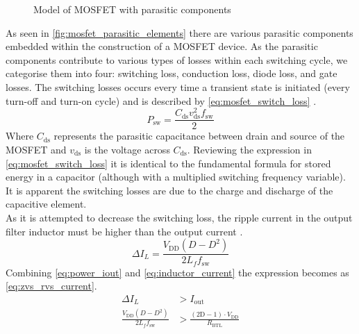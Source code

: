 \begin{figure}[htbp]
	\centering
	\begin{circuitikz}
		
	\end{circuitikz}
	\caption{Model of MOSFET with parasitic components}
	\label{fig:mosfet_parasitic_elements}
\end{figure}

As seen in \autoref{fig:mosfet_parasitic_elements} there are various parasitic components embedded within the construction of a MOSFET device. As the parasitic components contribute to various types of losses within each switching cycle, we categorise them into four: switching loss, conduction loss, diode loss, and gate losses. The switching losses occurs every time a transient state is initiated (every turn-off and turn-on cycle) and is described by \autoref{eq:mosfet_switch_loss} \cite{towards_higher_power_density_amplifiers}.
\begin{equation} \label{eq:mosfet_switch_loss}
	P_{\mathrm{sw}} = \frac{C_{\mathrm{ds}} v_{\mathrm{ds}}^{2}f_{\mathrm{sw}}}{2}
\end{equation}
Where $C_{\mathrm{ds}}$ represents the parasitic capacitance between drain and source of the MOSFET and $v_{\mathrm{ds}}$ is the voltage across $C_{\mathrm{ds}}$. Reviewing the expression in \autoref{eq:mosfet_switch_loss} it is identical to the fundamental formula for stored energy in a capacitor (although with a multiplied switching frequency variable). It is apparent the switching losses are due to the charge and discharge of the capacitive element. \\
As it is attempted to decrease the switching loss, the ripple current in the output filter inductor must be higher than the output current \cite{soren_simonsen}. 
\begin{equation} \label{eq:inductor_current}
	\Delta I_{L} = \frac{V_{\mathrm{DD}} (D - D^{2})}{2 L_{f}f_{\mathrm{sw}}}
\end{equation}
Combining \autoref{eq:power_iout} and \autoref{eq:inductor_current} the expression becomes as \autoref{eq:zvs_rvs_current}.
\begin{equation} \label{eq:zvs_rvs_current}
	\begin{split}
		\Delta I_{L} &> I_{\mathrm{out}} \\
		\frac{V_{\mathrm{DD}} (D - D^{2})}{2 L_{f}f_{\mathrm{sw}}} &> \frac{\left( 2\mathrm{D} - 1 \right) \cdot V_{\mathrm{DD}}}{R_{\mathrm{BTL}}}
	\end{split}	
\end{equation}

